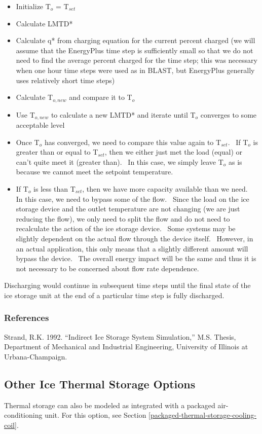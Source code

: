 \begin{itemize}
  \item
    Initialize T\(_{o}\) = T\(_{set}\)
  \item
    Calculate LMTD*
  \item
    Calculate q* from charging equation for the current percent charged (we will assume that the EnergyPlus time step is sufficiently small so that we do not need to find the average percent charged for the time step; this was necessary when one hour time steps were used as in BLAST, but EnergyPlus generally uses relatively short time steps)
  \item
    Calculate T\(_{o,new}\) and compare it to T\(_{o}\)
  \item
    Use T\(_{o,new}\) to calculate a new LMTD* and iterate until T\(_{o}\) converges to some acceptable level
  \item
    Once T\(_{o}\) has converged, we need to compare this value again to T\(_{set}\).~ If T\(_{o}\) is greater than or equal to T\(_{set}\), then we either just met the load (equal) or can't quite meet it (greater than).~ In this case, we simply leave T\(_{o}\) as is because we cannot meet the setpoint temperature.
  \item
    If T\(_{o}\) is less than T\(_{set}\), then we have more capacity available than we need.~ In this case, we need to bypass some of the flow.~ Since the load on the ice storage device and the outlet temperature are not changing (we are just reducing the flow), we only need to split the flow and do not need to recalculate the action of the ice storage device.~ Some systems may be slightly dependent on the actual flow through the device itself.~ However, in an actual application, this only means that a slightly different amount will bypass the device.~ The overall energy impact will be the same and thus it is not necessary to be concerned about flow rate dependence.
\end{itemize}

Discharging would continue in subsequent time steps until the final state of the ice storage unit at the end of a particular time step is fully discharged.

\subsubsection{References}\label{references-1-011}

Strand, R.K. 1992. ``Indirect Ice Storage System Simulation,'' M.S. Thesis, Department of Mechanical and Industrial Engineering, University of Illinois at Urbana-Champaign.

\subsection{Other Ice Thermal Storage Options}

Thermal storage can also be modeled as integrated with a packaged air-conditioning unit. For this option, see Section \ref{packaged-thermal-storage-cooling-coil}.
